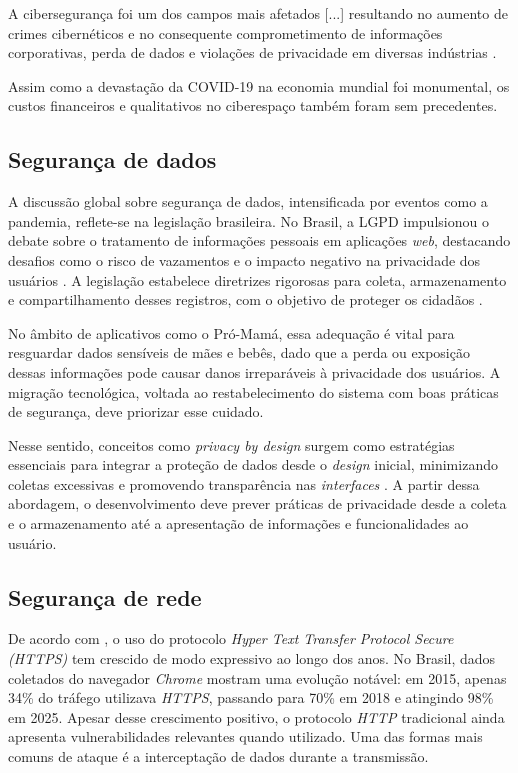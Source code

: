 \begin{citacao}
A cibersegurança foi um dos campos mais afetados [...] resultando no aumento de crimes cibernéticos e no consequente comprometimento de informações corporativas, perda de dados e violações de privacidade em diversas indústrias \cite[p.~2, tradução nossa]{cybersecuritycovid19}.
\end{citacao}

Assim como a devastação da COVID-19 na economia mundial foi monumental, os custos financeiros e qualitativos no ciberespaço também foram sem precedentes.

\subsection{Segurança de dados}

A discussão global sobre segurança de dados, intensificada por eventos como a pandemia, reflete-se na legislação brasileira. No Brasil, a LGPD impulsionou o debate sobre o tratamento de informações pessoais em aplicações \emph{web}, destacando desafios como o risco de vazamentos e o impacto negativo na privacidade dos usuários \cite{moura2024desafios}. A legislação estabelece diretrizes rigorosas para coleta, armazenamento e compartilhamento desses registros, com o objetivo de proteger os cidadãos \cite{lgpd}.

No âmbito de aplicativos como o Pró-Mamá, essa adequação é vital para resguardar dados sensíveis de mães e bebês, dado que a perda ou exposição dessas informações pode causar danos irreparáveis à privacidade dos usuários. A migração tecnológica, voltada ao restabelecimento do sistema com boas práticas de segurança, deve priorizar esse cuidado.

Nesse sentido, conceitos como \emph{privacy by design} surgem como estratégias essenciais para integrar a proteção de dados desde o \emph{design} inicial, minimizando coletas excessivas e promovendo transparência nas \emph{interfaces} \cite{moura2024desafios}. A partir dessa abordagem, o desenvolvimento deve prever práticas de privacidade desde a coleta e o armazenamento até a apresentação de informações e funcionalidades ao usuário.

\subsection{Segurança de rede}

De acordo com , o uso do protocolo \emph{Hyper Text Transfer Protocol Secure (HTTPS)} tem crescido de modo expressivo ao longo dos anos. No Brasil, dados coletados do navegador \emph{Chrome} mostram uma evolução notável: em 2015, apenas 34\% do tráfego utilizava \emph{HTTPS}, passando para 70\% em 2018 e atingindo 98\% em 2025. Apesar desse crescimento positivo, o protocolo \emph{HTTP} tradicional ainda apresenta vulnerabilidades relevantes quando utilizado. Uma das formas mais comuns de ataque é a interceptação de dados durante a transmissão.

